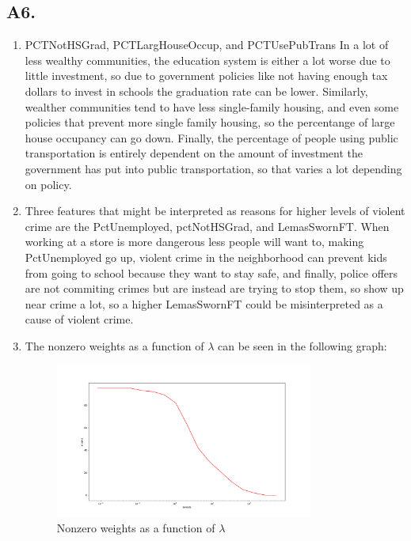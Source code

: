 \documentclass[12pt]{article}
\theoremstyle{definitionstyle}
\begin{document}
    \subsection*{A6.}
    \begin{enumerate}[label=\alph*.]
        \item PCTNotHSGrad, PCTLargHouseOccup, and PCTUsePubTrans
        In a lot of less wealthy communities, the education system is either a lot worse due to little investment, so due to government policies like not having enough tax dollars to invest in schools the graduation rate can be lower. Similarly, wealther communities tend to have less single-family housing, and even some policies that prevent more single family housing, so the percentange of large house occupancy can go down. Finally, the percentage of people using public transportation is entirely dependent on the amount of investment the government has put into public transportation, so that varies a lot depending on policy.

        \item Three features that might be interpreted as reasons for higher levels of violent crime are the PctUnemployed, pctNotHSGrad, and LemasSwornFT. When working at a store is more dangerous less people will want to, making PctUnemployed go up, violent crime in the neighborhood can prevent kids from going to school because they want to stay safe, and finally, police offers are not commiting crimes but are instead are trying to stop them, so show up near crime a lot, so a higher LemasSwornFT could be misinterpreted as a cause of violent crime.
        
        \item The nonzero weights as a function of $\lambda$ can be seen in the following graph:
        \begin{figure}[H]
            \centering
            \includegraphics[width=0.8\textwidth]{crime_nonzero_weights.png}
            \caption{Nonzero weights as a function of $\lambda$}
        \end{figure}


\end{enumerate}
\end{document}
